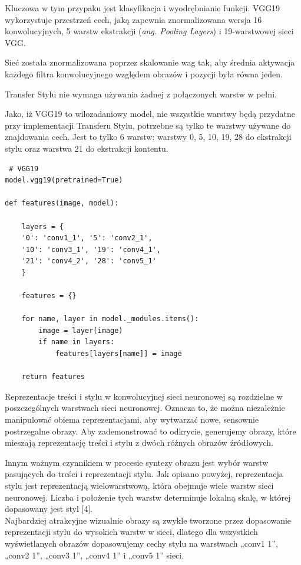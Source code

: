 \documentclass[brudnopis]{xmgr}
\begin{document}
Kluczowa w tym przypaku jest klasyfikacja i wyodrębnianie funkcji.
VGG19 wykorzystuje przestrzeń cech, jaką zapewnia znormalizowana wersja 16 konwolucyjnych, 5 warstw ekstrakcji (\textit{ang. Pooling Layers}) i 19-warstwowej sieci VGG. 

Sieć została znormalizowana poprzez skalowanie wag tak, aby średnia aktywacja każdego filtra konwolucyjnego względem obrazów i pozycji była równa jeden. 

Transfer Stylu nie wymaga używania żadnej z połączonych warstw w pełni. 

Jako, iż VGG19 to wilozadaniowy model, nie wszystkie warstwy będą przydatne przy implementacji Transferu Stylu, potrzebne są tylko te warstwy używane do znajdowania cech. Jest to tylko 6 warstw: warstwy 0, 5, 10, 19, 28 do ekstrakcji stylu oraz warstwa 21 do ekstrakcji kontentu.

\begin{lstlisting}
 # VGG19
model.vgg19(pretrained=True) 
 
def features(image, model):

	layers = {
	'0': 'conv1_1', '5': 'conv2_1', 
	'10': 'conv3_1', '19': 'conv4_1', 
	'21': 'conv4_2', '28': 'conv5_1'
	}

	features = {}

	for name, layer in model._modules.items():
		image = layer(image)
		if name in layers:
			features[layers[name]] = image

	return features
\end{lstlisting}


Reprezentacje treści i stylu w konwolucyjnej sieci neuronowej są rozdzielne w poszczególnych warstwach sieci neuronowej. Oznacza to, że można niezależnie manipulować obiema reprezentacjami, aby wytwarzać nowe, sensownie postrzegalne obrazy. Aby zademonstrować to odkrycie, generujemy obrazy, które mieszają reprezentację treści i stylu z dwóch różnych obrazów źródłowych.

Innym ważnym czynnikiem w procesie syntezy obrazu jest wybór warstw pasujących do treści i reprezentacji stylu. Jak opisano powyżej, reprezentacja stylu jest reprezentacją wielowarstwową, która obejmuje wiele warstw sieci neuronowej. Liczba i położenie tych warstw determinuje lokalną skalę, w której dopasowany jest styl [4]. 
\\
 Najbardziej atrakcyjne wizualnie obrazy są zwykle tworzone przez dopasowanie reprezentacji stylu do wysokich warstw w sieci, dlatego dla wszystkich wyświetlanych obrazów dopasowujemy cechy stylu na warstwach „conv1 1”, „conv2 1”, „conv3 1”, „conv4 1” i „conv5 1” sieci.
\end{document}
